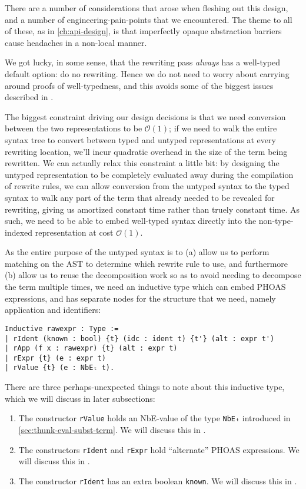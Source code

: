 There are a number of considerations that arose when fleshing out this design, and a number of engineering-pain-points that we encountered.
The theme to all of these, as in \autoref{ch:api-design}, is that imperfectly opaque abstraction barriers cause headaches in a non-local manner.

We got lucky, in some sense, that the rewriting pass \emph{always} has a well-typed default option: do no rewriting.
Hence we do not need to worry about carrying around proofs of well-typedness, and this avoids some of the biggest issues described in .

The biggest constraint driving our design decisions is that we need conversion between the two representations to be $\mathcal{O}(1)$; if we need to walk the entire syntax tree to convert between typed and untyped representations at every rewriting location, we'll incur quadratic overhead in the size of the term being rewritten.
We can actually relax this constraint a little bit: by designing the untyped representation to be completely evaluated away during the compilation of rewrite rules, we can allow conversion from the untyped syntax to the typed syntax to walk any part of the term that already needed to be revealed for rewriting, giving us amortized constant time rather than truely constant time.
As such, we need to be able to embed well-typed syntax directly into the non-type-indexed representation at cost $\mathcal{O}(1)$.

As the entire purpose of the untyped syntax is to (a) allow us to perform matching on the AST to determine which rewrite rule to use, and furthermore (b) allow us to reuse the decomposition work so as to avoid needing to decompose the term multiple times, we need an inductive type which can embed PHOAS expressions, and has separate nodes for the structure that we need, namely application and identifiers:
\begin{verbatim}
Inductive rawexpr : Type :=
| rIdent (known : bool) {t} (idc : ident t) {t'} (alt : expr t')
| rApp (f x : rawexpr) {t} (alt : expr t)
| rExpr {t} (e : expr t)
| rValue {t} (e : NbEₜ t).
\end{verbatim}
\label{sec:rewriting-more:rawexpr-def}%
There are three perhaps-unexpected things to note about this inductive type, which we will discuss in later subsections:
\begin{enumerate}
\item
  The constructor \texttt{rValue} holds an NbE-value of the type \texttt{NbEₜ} introduced in \autoref{sec:thunk-eval-subst-term}.
  We will discuss this in .
\item
  The constructors \texttt{rIdent} and \texttt{rExpr} hold ``alternate'' PHOAS expressions.
  We will discuss this in .
\item
  The constructor \texttt{rIdent} has an extra boolean \texttt{known}.
  We will discuss this in .
\end{enumerate}

